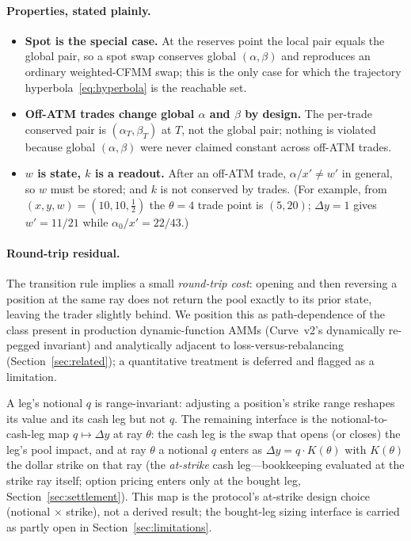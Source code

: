 \documentclass[11pt]{article}
\begin{document}
\paragraph{Properties, stated plainly.}
\begin{itemize}[leftmargin=2em]
  \item \textbf{Spot is the special case.} At the reserves point the local pair
        equals the global pair, so a spot swap conserves global $(\alpha,\beta)$
        and reproduces an ordinary weighted-CFMM swap; this is the only case for
        which the trajectory hyperbola~\eqref{eq:hyperbola} is the reachable set.
  \item \textbf{Off-ATM trades change global $\alpha$ and $\beta$ by design.} The
        per-trade conserved pair is $(\alpha_T,\beta_T)$ at $T$, not the global
        pair; nothing is violated because global $(\alpha,\beta)$ were never
        claimed constant across off-ATM trades.
  \item \textbf{$w$ is state, $k$ is a readout.} After an off-ATM trade,
        $\alpha/x'\neq w'$ in general, so $w$ must be stored; and $k$ is not
        conserved by trades. (For example, from $(x,y,w)=(10,10,\tfrac12)$ the
        $\theta=4$ trade point is $(5,20)$; $\Delta y=1$ gives $w'=11/21$ while
        $\alpha_0/x'=22/43$.)
\end{itemize}

\paragraph{Round-trip residual.}
The transition rule implies a small \emph{round-trip cost}: opening and then
reversing a position at the same ray does not return the pool exactly to its prior
state, leaving the trader slightly behind. We position this as path-dependence of
the class present in production dynamic-function AMMs (Curve~v2's dynamically
re-pegged invariant) and analytically adjacent to loss-versus-rebalancing
(Section~\ref{sec:related}); a quantitative treatment is deferred and flagged as a
limitation.

A leg's notional $q$ is range-invariant: adjusting a position's strike range
reshapes its value and its cash leg but not $q$. The remaining interface is the
notional-to-cash-leg map $q\mapsto\Delta y$ at ray $\theta$: the cash leg is the
swap that opens (or closes) the leg's pool impact, and at ray $\theta$ a notional
$q$ enters as $\Delta y=q\cdot K(\theta)$ with $K(\theta)$ the dollar strike on
that ray (the \emph{at-strike} cash leg---bookkeeping evaluated at the strike ray
itself; option pricing enters only at the bought leg,
Section~\ref{sec:settlement}). This map is the protocol's at-strike
design choice (notional $\times$ strike), not a derived result; the bought-leg
sizing interface is carried as partly open in Section~\ref{sec:limitations}.
\end{document}
